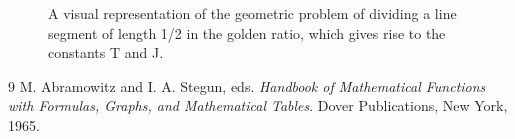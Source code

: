 \documentclass{amsart}
\theoremstyle{plain}
\theoremstyle{definition}
\theoremstyle{remark}
\begin{document}
\begin{figure}[htbp]
    \centering
    \caption{A visual representation of the geometric problem of dividing a line segment of length 1/2 in the golden ratio, which gives rise to the constants T and J.}
    \label{fig:geometry}
\end{figure}

\begin{thebibliography}{9}
M. Abramowitz and I. A. Stegun, eds.
\textit{Handbook of Mathematical Functions with Formulas, Graphs, and Mathematical Tables}.
Dover Publications, New York, 1965.
\end{thebibliography}
\end{document}
